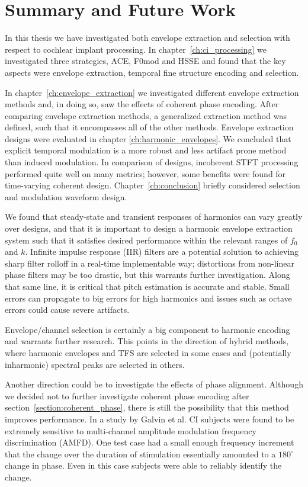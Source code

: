 \documentclass [11pt, proquest,oneside] {ganter_thesis}[2015/03/03]
\begin{document}
\section{Summary and Future Work}

In this thesis we have investigated both envelope extraction and selection with respect to cochlear implant processing.  In chapter~\ref{ch:ci_processing} we investigated three strategies, ACE, F0mod and HSSE and found that the key aspects were envelope extraction, temporal fine structure encoding and selection.

In chapter~\ref{ch:envelope_extraction} we investigated different envelope extraction methods and, in doing so, saw the effects of coherent phase encoding.  After comparing envelope extraction methods, a generalized extraction method was defined, such that it encompasses all of the other methods.  Envelope extraction designs were evaluated in chapter \ref{ch:harmonic_envelopes}.  We concluded that explicit temporal modulation is a more robust and less artifact prone method than induced modulation.  In comparison of designs, incoherent STFT processing performed quite well on many metrics; however, some benefits were found for time-varying coherent design.  Chapter~\ref{ch:conclusion} briefly considered selection and modulation waveform design.

We found that steady-state and transient responses of harmonics can vary greatly over designs, and that it is important to design a harmonic envelope extraction system such that it satisfies desired performance within the relevant ranges of $f_0$ and $k$.  Infinite impulse response (IIR) filters are a potential solution to achieving sharp filter rolloff in a real-time implementable way; distortions from non-linear phase filters may be too drastic, but this warrants further investigation.  Along that same line, it is critical that pitch estimation is accurate and stable.  Small errors can propagate to big errors for high harmonics and issues such as octave errors could cause severe artifacts.

Envelope/channel selection is certainly a big component to harmonic encoding and warrants further research.  This points in the direction of hybrid methods, where harmonic envelopes and TFS are selected in some cases and (potentially inharmonic) spectral peaks are selected in others.

Another direction could be to investigate the effects of phase alignment.  Although we decided not to further investigate coherent phase encoding after section~\ref{section:coherent_phase}, there is still the possibility that this method improves performance.  In a study by Galvin et al. \cite{galvin2015envelope} CI subjects were found to be extremely sensitive to multi-channel amplitude modulation frequency discrimination (AMFD).  One test case had a small enough frequency increment that the change over the duration of stimulation essentially amounted to a $180^\circ$ change in phase.  Even in this case subjects were able to reliably identify the change.
\end{document}

